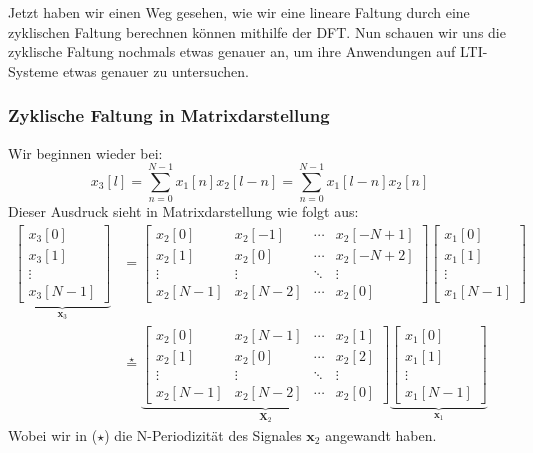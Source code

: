 \documentclass[11pt]{article}
\begin{document}
Jetzt haben wir einen Weg gesehen, wie wir eine lineare Faltung durch eine zyklischen Faltung berechnen können mithilfe der DFT. Nun schauen wir uns die zyklische Faltung nochmals etwas genauer an, um ihre Anwendungen auf LTI-Systeme etwas genauer zu untersuchen.

\subsubsection*{Zyklische Faltung in Matrixdarstellung}
\vspace*{-0.5cm}
Wir beginnen wieder bei:
$$x_3[l] = \sum_{n=0}^{N-1} x_1[n]x_2[l-n] = \sum_{n=0}^{N-1} x_1[l-n] x_2[n]$$
Dieser Ausdruck sieht in Matrixdarstellung wie folgt aus:
\vspace*{-0.1cm}
\begin{align*}
    \underbrace{\begin{bmatrix}
        x_3[0] \\
        x_3[1] \\
        \vdots \\
        x_3[N-1]
    \end{bmatrix}}_{\mathbf{x}_3} &= \begin{bmatrix}
        x_2[0] & x_2[-1] & \cdots & x_2[-N+1] \\
        x_2[1] & x_2[0] & \cdots & x_2[-N+2] \\
        \vdots & \vdots & \ddots & \vdots \\
        x_2[N-1] & x_2[N-2] & \cdots & x_2[0]
    \end{bmatrix} \begin{bmatrix}
        x_1[0] \\
        x_1[1] \\
        \vdots \\
        x_1[N-1]
    \end{bmatrix} \\
    &\overset{\star}{=} \underbrace{\begin{bmatrix}
        x_2[0] & x_2[N-1] & \cdots & x_2[1] \\
        x_2[1] & x_2[0] & \cdots & x_2[2] \\
        \vdots & \vdots & \ddots & \vdots \\
        x_2[N-1] & x_2[N-2] & \cdots & x_2[0]
    \end{bmatrix}}_{\mathbf{X}_2} \underbrace{\begin{bmatrix}
        x_1[0] \\
        x_1[1] \\
        \vdots \\
        x_1[N-1]
    \end{bmatrix}}_{\mathbf{x}_1}
\end{align*}
Wobei wir in ($\star$) die N-Periodizität des Signales $\mathbf{x}_2$ angewandt haben.
\end{document}
